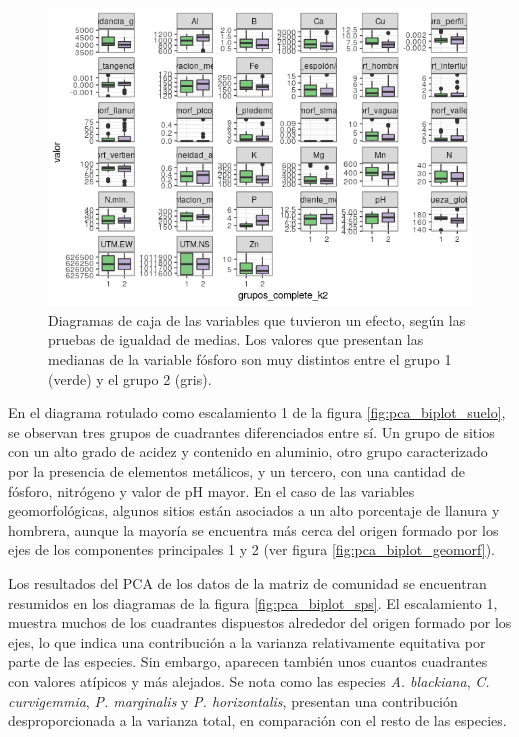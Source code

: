 \documentclass[11pt,]{article}
\begin{document}
\begin{figure}
\centering
\includegraphics{diagrama_caja_igualdad_medias_complete.png}
\caption{Diagramas de caja de las variables que tuvieron un efecto,
según las pruebas de igualdad de medias. Los valores que presentan las
medianas de la variable fósforo son muy distintos entre el grupo 1
(verde) y el grupo 2 (gris).
\label{fig:diagrama_caja_igualdad_medias_complete}}
\end{figure}

En el diagrama rotulado como escalamiento 1 de la figura
\ref{fig:pca_biplot_suelo}, se observan tres grupos de cuadrantes
diferenciados entre sí. Un grupo de sitios con un alto grado de acidez y
contenido en aluminio, otro grupo caracterizado por la presencia de
elementos metálicos, y un tercero, con una cantidad de fósforo,
nitrógeno y valor de pH mayor. En el caso de las variables
geomorfológicas, algunos sitios están asociados a un alto porcentaje de
llanura y hombrera, aunque la mayoría se encuentra más cerca del origen
formado por los ejes de los componentes principales 1 y 2 (ver figura
\ref{fig:pca_biplot_geomorf}).

Los resultados del PCA de los datos de la matriz de comunidad se
encuentran resumidos en los diagramas de la figura
\ref{fig:pca_biplot_sps}. El escalamiento 1, muestra muchos de los
cuadrantes dispuestos alrededor del origen formado por los ejes, lo que
indica una contribución a la varianza relativamente equitativa por parte
de las especies. Sin embargo, aparecen también unos cuantos cuadrantes
con valores atípicos y más alejados. Se nota como las especies \emph{A.
blackiana}, \emph{C. curvigemmia}, \emph{P. marginalis} y \emph{P.
horizontalis}, presentan una contribución desproporcionada a la varianza
total, en comparación con el resto de las especies.
\end{document}
